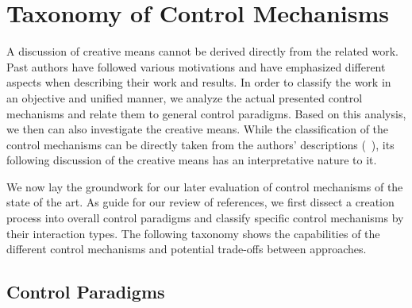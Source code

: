 

\section{Taxonomy of Control Mechanisms}
\label{sec:taxo_control_mechanism}





A discussion of creative means cannot be derived directly from the related work. Past authors have followed various motivations and have emphasized different aspects when describing their work and results. In order to classify the work in an objective and unified manner, we analyze the actual presented control mechanisms and relate them to general control paradigms. Based on this analysis, we then can also investigate the creative means. While the classification of the control mechanisms can be directly taken from the authors' descriptions (~), its following discussion of the creative means has an interpretative nature to it. 

We now lay the groundwork for our later evaluation of control mechanisms of the state of the art. As guide for our review of references, we first dissect a creation process into overall control paradigms and classify specific control mechanisms by their interaction types. The following taxonomy shows the capabilities of the different control mechanisms and potential trade-offs between approaches.  

\newcommand{\controlParamsFigWidth}{1.0}

\subsection{Control Paradigms}

